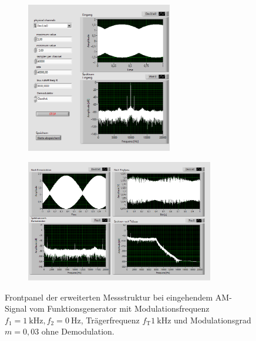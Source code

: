 \begin{figure}[H]
	\centering
	\begin{subfigure}[c]{\textwidth}
		\centering
		\includegraphics[width=0.7\textwidth]{pic/dam_quadrat1.png}
	\end{subfigure}
	\begin{subfigure}[c]{\textwidth}
		\centering
		\includegraphics[width=0.9\textwidth]{pic/dam_quadrat2.png}
	\end{subfigure}	
	\caption{Frontpanel der erweiterten Messstruktur bei eingehendem AM-Signal vom Funktionsgenerator mit Modulationsfrequenz $f_1= \SI{1}{\kilo\hertz}, f_2 = \SI{0}{\hertz}$, Trägerfrequenz $f_\text{T}\SI{1}{\kilo\hertz}$ und Modulationsgrad $m = 0,03$ ohne Demodulation.}
	\label{fig:dam_quadrat}	
\end{figure} 

